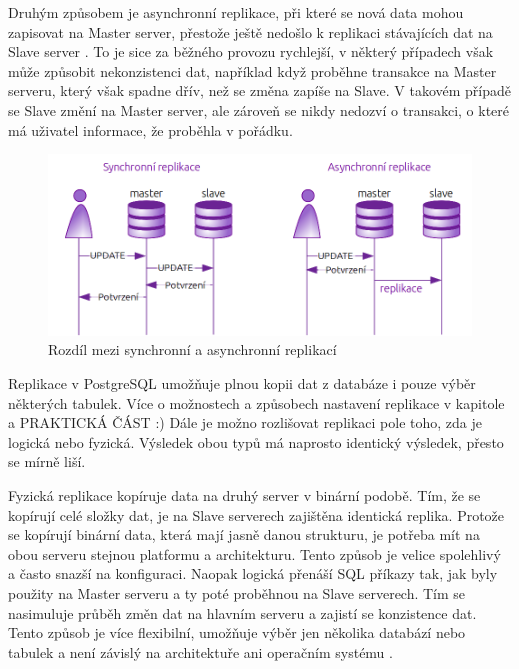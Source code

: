 Druhým způsobem je asynchronní replikace, při které se nová data mohou zapisovat na Master server, přestože ještě nedošlo k replikaci stávajících dat na Slave server \citep{ObeHsu2012}. To je sice za běžného provozu rychlejší, v některý případech však může způsobit nekonzistenci dat, například když proběhne transakce na Master serveru, který však spadne dřív, než se změna zapíše na Slave. V takovém případě se Slave změní na Master server, ale zároveň se nikdy nedozví o transakci, o které má uživatel informace, že proběhla v pořádku. 

        \begin{figure}[H]
          \centering
          \includegraphics[scale=1]{../../../grafy/obr/schema_asyncSync_maxiTence.png}
          \caption {Rozdíl mezi synchronní a asynchronní replikací}
        \end{figure}

Replikace v PostgreSQL umožňuje plnou kopii dat z databáze i pouze výběr některých tabulek. Více o možnostech a způsobech nastavení replikace v kapitole \odkazKapitola{} a PRAKTICKÁ ČÁST :)
Dále je možno rozlišovat replikaci pole toho, zda je logická nebo fyzická. Výsledek obou typů má naprosto identický výsledek, přesto se mírně liší. 

Fyzická replikace kopíruje data na druhý server v binární podobě. Tím, že se kopírují celé složky dat, je na Slave serverech zajištěna identická replika. Protože se kopírují binární data, která mají jasně danou strukturu, je potřeba mít na obou serveru stejnou platformu a architekturu. Tento způsob je velice spolehlivý a často snazší na konfiguraci. Naopak logická přenáší SQL příkazy tak, jak byly použity na Master serveru a ty poté proběhnou na Slave serverech. Tím se nasimuluje průběh změn dat na hlavním serveru a zajistí se konzistence dat. Tento způsob je více flexibilní, umožňuje výběr jen několika databází nebo tabulek a není závislý na architektuře ani operačním systému \citep{Boszormenyi2013}. 

